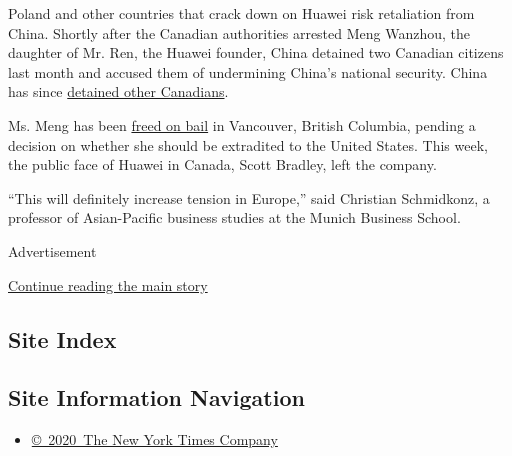 Poland and other countries that crack down on Huawei risk retaliation
from China. Shortly after the Canadian authorities arrested Meng
Wanzhou, the daughter of Mr. Ren, the Huawei founder, China detained two
Canadian citizens last month and accused them of undermining China's
national security. China has since
\href{https://www.nytimes.com/2018/12/20/world/asia/china-canadian-detained.html}{detained
other Canadians}.

Ms. Meng has been
\href{https://www.nytimes.com/2018/12/11/technology/huawei-executive-canada-bail-decision.html}{freed
on bail} in Vancouver, British Columbia, pending a decision on whether
she should be extradited to the United States. This week, the public
face of Huawei in Canada, Scott Bradley, left the company.

``This will definitely increase tension in Europe,'' said Christian
Schmidkonz, a professor of Asian-Pacific business studies at the Munich
Business School.

Advertisement

\protect\hyperlink{after-bottom}{Continue reading the main story}

\hypertarget{site-index}{%
\subsection{Site Index}\label{site-index}}

\hypertarget{site-information-navigation}{%
\subsection{Site Information
Navigation}\label{site-information-navigation}}

\begin{itemize}
\tightlist
\item
  \href{https://help.nytimes.com/hc/en-us/articles/115014792127-Copyright-notice}{©~2020~The
  New York Times Company}
\end{itemize}

